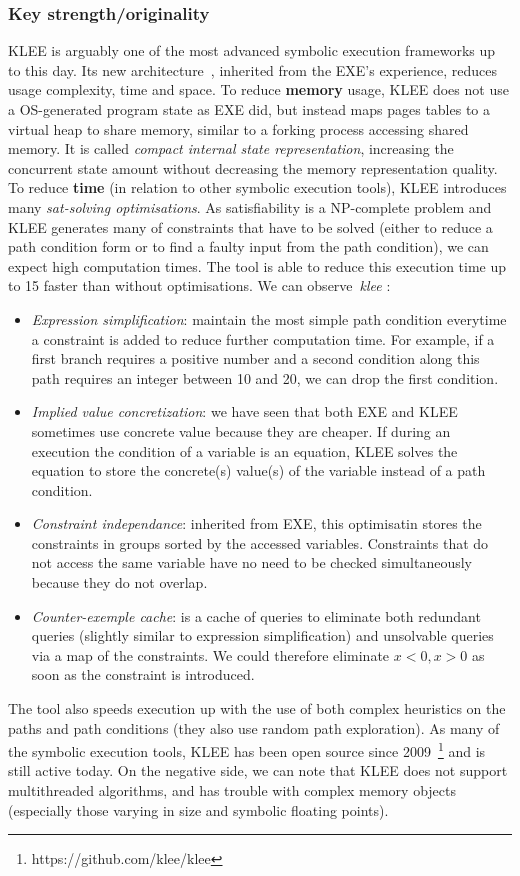 \documentclass[11pt, conference]{IEEEtran}
\begin{document}
    \subsubsection*{Key strength/originality}
    KLEE is arguably one of the most advanced symbolic execution frameworks up to this day. Its new architecture~\cite{klee}, inherited from the EXE's experience, reduces usage complexity, time and space. To reduce \textbf{memory} usage, KLEE does not use a OS-generated program state as EXE did, but instead maps pages tables to a virtual heap to share memory, similar to a forking process accessing shared memory. It is called \emph{compact internal state representation}, increasing the concurrent state amount without decreasing the memory representation quality. To reduce \textbf{time} (in relation to other symbolic execution tools), KLEE introduces many \emph{sat-solving optimisations}. As satisfiability is a NP-complete problem and KLEE generates many of constraints that have to be solved (either to reduce a path condition form or to find a faulty input from the path condition), we can expect high computation times. The tool is able to reduce this execution time up to 15 faster than without optimisations. We can observe~\emph{klee} :
    \begin{itemize}
      \item \emph{Expression simplification}: maintain the most simple path condition everytime a constraint is added to reduce further computation time. For example, if a first branch requires a positive number and a second condition along this path requires an integer between 10 and 20, we can drop the first condition.
      \item \emph{Implied value concretization}: we have seen that both EXE and KLEE sometimes use concrete value because they are cheaper. If during an execution the condition of a variable is an equation, KLEE solves the equation to store the concrete(s) value(s) of the variable instead of a path condition.
      \item \emph{Constraint independance}: inherited from EXE, this optimisatin stores the constraints in groups sorted by the accessed variables. Constraints that do not access the same variable have no need to be checked simultaneously because they do not overlap.
      \item \emph{Counter-exemple cache}: is a cache of queries to eliminate both redundant queries (slightly similar to expression simplification) and unsolvable queries via a map of the constraints. We could therefore eliminate ${x < 0, x > 0}$ as soon as the constraint is introduced.
    \end{itemize}
    The tool also speeds execution up with the use of both complex heuristics on the paths and path conditions (they also use random path exploration). As many of the symbolic execution tools, KLEE has been open source since 2009~\footnote{https://github.com/klee/klee} and is still active today. On the negative side, we can note that KLEE does not support multithreaded algorithms, and has trouble with complex memory objects (especially those varying in size and symbolic floating points).
\end{document}
